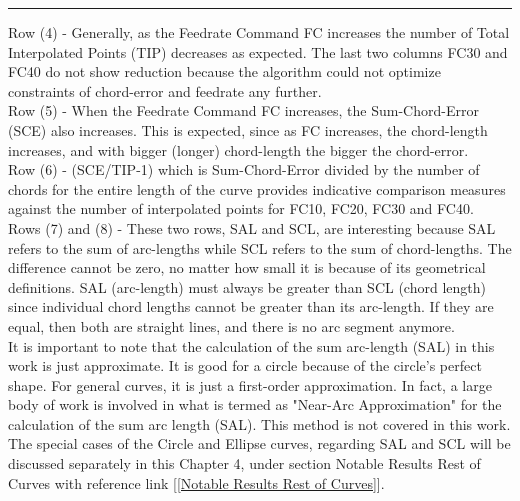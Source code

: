 \begin{table}[ht]
{%

}   %
\hrule
\end{table}

\clearpage
\pagebreak

Row (4) - Generally, as the Feedrate Command FC increases the number of Total Interpolated Points (TIP) decreases as expected. The last two columns FC30 and FC40 do not show reduction because the algorithm could not optimize constraints of chord-error and feedrate any further.\\

Row (5) - When the Feedrate Command FC increases, the Sum-Chord-Error (SCE) also increases. This is expected, since as FC increases, the chord-length increases, and with bigger (longer) chord-length the bigger the chord-error. \\

Row (6) - (SCE/TIP-1) which is Sum-Chord-Error divided by the number of chords for the entire length of the curve provides indicative comparison measures against the number of interpolated points for FC10, FC20, FC30 and FC40. \\

Rows (7) and (8) - These two rows, SAL and SCL, are interesting because SAL refers to the sum of arc-lengths while SCL refers to the sum of chord-lengths. The difference cannot be zero, no matter how small it is because of its geometrical definitions. SAL (arc-length) must always be greater than SCL (chord length) since individual chord lengths cannot be greater than its arc-length. If they are equal, then both are straight lines, and there is no arc segment anymore. \\

It is important to note that the calculation of the sum arc-length (SAL) in this work is just approximate. It is good for a circle because of the circle's perfect shape. For general curves, it is just a first-order approximation. In fact, a large body of work is involved in what is termed as "Near-Arc Approximation" for the calculation of the sum arc length (SAL). This method is not covered in this work. \\   

The special cases of the Circle and Ellipse curves, regarding SAL and SCL will be discussed separately in this Chapter 4, under section Notable Results Rest of Curves with reference link [\ref{Notable Results Rest of Curves}]. \\

